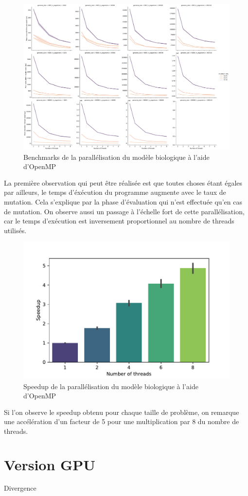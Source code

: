 \documentclass[a4paper, 10pt, twoside]{article}
\begin{document}
\begin{figure}
	\includegraphics[width=\linewidth]{img/benchmark_omp_static.pdf}
	\caption{Benchmarks de la parallélisation du modèle biologique à l'aide d'OpenMP}
\end{figure}

La première observation qui peut être réalisée est que toutes choses étant égales par ailleurs, le temps d'éxécution du programme augmente avec le taux de mutation. Cela s'explique par la phase d'évaluation qui n'est effectuée qu'en cas de mutation. On observe aussi un passage à l'échelle fort de cette parallélisation, car le temps d'exécution est inversement proportionnel au nombre de threads utilisés.

\begin{figure}
	\centering
	\includegraphics[width=0.5\linewidth]{img/speedup.pdf}
	\caption{Speedup de la parallélisation du modèle biologique à l'aide d'OpenMP}
\end{figure}

Si l'on observe le speedup obtenu pour chaque taille de problème, on remarque une accélération d'un facteur de 5 pour une multiplication par 8 du nombre de threads.

\section{Version GPU}

Divergence \citep{nvidia/branching}





\end{document}
